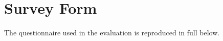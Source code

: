 
%
\section{Survey Form}
\label{app:survey_form}
The questionnaire used in the evaluation is reproduced in full below.

